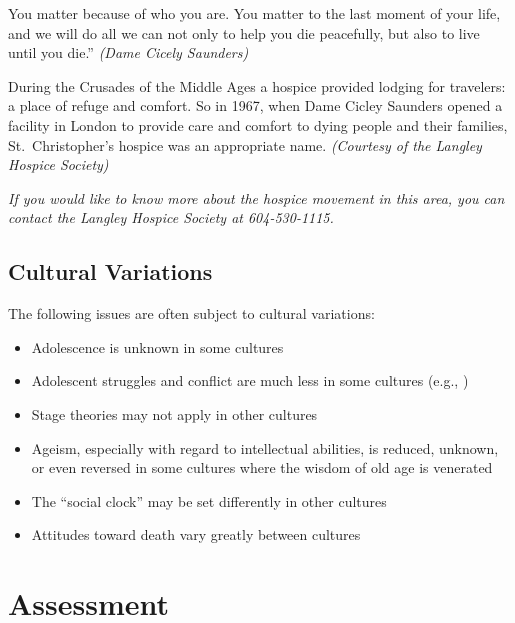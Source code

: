 \documentclass[
]{book}
\providecommand{\tightlist}{%
  \setlength{\itemsep}{0pt}\setlength{\parskip}{0pt}}
\begin{document}
You matter because of who you are. You matter to the last moment of your life, and we will do all we can not only to help you die peacefully, but also to live until you die.'' \emph{(Dame Cicely Saunders)}

During the Crusades of the Middle Ages a hospice provided lodging for travelers: a place of refuge and comfort. So in 1967, when Dame Cicley Saunders opened a facility in London to provide care and comfort to dying people and their families, St.~Christopher's hospice was an appropriate name. \emph{(Courtesy of the Langley Hospice Society)}

\emph{If you would like to know more about the hospice movement in this area, you can contact the Langley Hospice Society at 604-530-1115.}

\hypertarget{cultural-variations}{%
\subsection*{Cultural Variations}\label{cultural-variations}}

The following issues are often subject to cul­tural variations:

\begin{itemize}
\tightlist
\item
  Adolescence is unknown in some cultures\\
\item
  Adolescent struggles and conflict are much less in some cultures (e.g., )\\
\item
  Stage theories may not apply in other cultures\\
\item
  Ageism, especially with regard to intellectual abilities, is reduced, unknown, or even reversed in some cultures where the wisdom of old age is venerated\\
\item
  The ``social clock'' may be set differently in other cultures\\
\item
  Attitudes toward death vary greatly between cultures
\end{itemize}

\hypertarget{assessment-3}{%
\section{Assessment}\label{assessment-3}}
\end{document}
